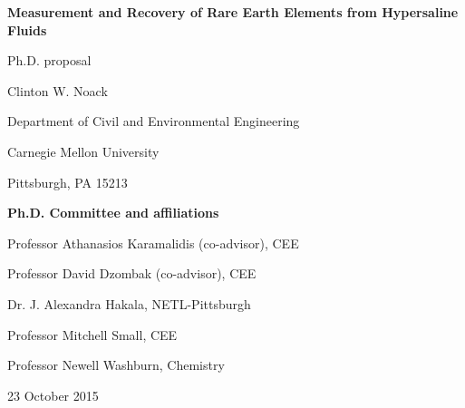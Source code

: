\thispagestyle{empty}
\begin{center}

\Huge{\textbf{Measurement and Recovery of Rare Earth Elements from Hypersaline Fluids}}
\vspace{1cm}

\normalsize{Ph.D. proposal}
\vspace{1cm}

\Large{Clinton W. Noack}
\vspace{1cm}

\normalsize{
Department of Civil and Environmental Engineering

Carnegie Mellon University

Pittsburgh, PA 15213}
\vspace{2cm}

\normalsize{
\textbf{Ph.D. Committee and affiliations}

Professor Athanasios Karamalidis (co-advisor), CEE

Professor David Dzombak (co-advisor), CEE

Dr. J. Alexandra Hakala, NETL-Pittsburgh

Professor Mitchell Small, CEE

Professor Newell Washburn, Chemistry
}

\vspace{1cm}


23 October 2015

\end{center}

 \clearpage